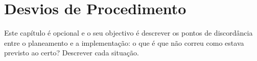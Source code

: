 \chapter{Desvios de Procedimento}
\label{cap:detour}

Este capítulo é opcional e o seu objectivo é descrever os pontos de discordância entre o planeamento e a implementação: o que é que não correu como estava previsto ao certo? Descrever cada situação.